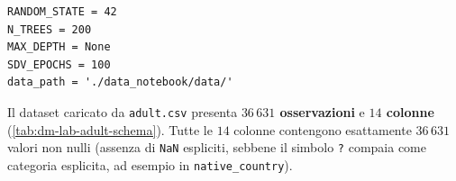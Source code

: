 \begin{lstlisting}[style=pythoncode, caption={Configurazione dei parametri globali di riproducibilit\`a per gli esperimenti.}]
RANDOM_STATE = 42
N_TREES = 200
MAX_DEPTH = None
SDV_EPOCHS = 100
data_path = './data_notebook/data/'
\end{lstlisting}

Il dataset caricato da \texttt{adult.csv} presenta \textbf{$36\,631$ osservazioni} e \textbf{$14$ colonne} (\autoref{tab:dm-lab-adult-schema}). Tutte le $14$ colonne contengono esattamente $36\,631$ valori non nulli (assenza di \texttt{NaN} espliciti, sebbene il simbolo \texttt{?} compaia come categoria esplicita, ad esempio in \texttt{native\_country}).

\begin{table}[H]
\centering
\caption{Schema delle $14$ colonne del dataset \textit{Adult} ($36\,631$ record non nulli).}
\label{tab:dm-lab-adult-schema}
\small
{}
\end{table}


